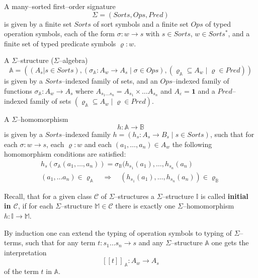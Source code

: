 \documentclass[landscape, autoslides, light]{mmiss}
\newcommand{\ekl}{[\![}
\newcommand{\ekr}{]\!]}
\begin{document}
\begin{Package}[Label={FSDPT}, Title={Formal Specification of Data and Process Types}, ShortTitle={FSDPT}, Authors={Horst Reichel}, Date={February 2003}, LevelOfDetail=Lecture, Language=en-GB]
\begin{Section}[Title={Initial Algebras as Data Types}, Label={section3}]
\begin{Section}[Title={Existence of initial models}, Label={section3_1}]
\begin{Paragraph}[Label=Paragraph24]
\pause

\small
\begin{Definition}[Title = {Many--sorted first--order signature}, Label = {signature}]
 A many--sorted first--order signature $$\Sigma =
(Sorts, Ops, Pred)$$ is given by a finite set $Sorts$ of sort
symbols and a finite set $Ops$ of typed operation symbols, each of
the form $\sigma : w \to s$ with $s \in Sorts$, $w \in Sorts^*$,
and a finite set of typed predicate symbols $\varrho : w$.

A $\Sigma$--structure ($\Sigma$--algebra) $$\mathbb{A} = ((A_s | s
\in Sorts), (\sigma_{\mathbb A} : A_w \to A_s \; | \; \sigma \in
Ops), (\varrho_{\mathbb A} \subseteq A_w \; | \;\varrho \in Pred
))$$ is given by a $Sorts$--indexed family of sets, and an
$Ops$--indexed family of functions $\sigma_{\mathbb A} : A_w \to
A_s $ where $A_{s_1\ldots s_n} = A_{s_1} \times \ldots A_{s_n}$
and $A_{\varepsilon} = \mathbf{1}$ and a $Pred$--indexed family of
sets $(\varrho_{\mathbb A} \subseteq A_w \; | \; \varrho \in
Pred)$.

A $\Sigma$--homomorphism $$h : \mathbb{A} \to \mathbb{B}$$ is
given by a $Sorts$--indexed family $h = (h_s : A_s \to B_s\; | \;
s \in Sorts)$, such that for each $\sigma : w \to s$, each
$\varrho : w$ and each $(a_1, \ldots , a_n) \in A_w$ the following
homomorphism conditions are satisfied: $$\begin{array}{ll}
 h_s(\sigma_{\mathbb A}(a_1, \ldots ,a_n)) = \sigma_{\mathbb
 B}(h_{s_1}(a_1), \ldots , h_{s_n}(a_n) \\
 (a_1, \ldots a_n) \in \varrho_{\mathbb A} \quad \Rightarrow \quad
 (h_{s_1}(a_1), \ldots , h_{s_n}(a_n)) \in \varrho_{\mathbb B}
 \end{array}$$ \end{Definition}



\end{Paragraph}
\begin{Paragraph}[Label=Paragraph25]
 \small
 Recall, that for a given class $\mathcal{C}$ of
 $\Sigma$--structures a $\Sigma$--structure $\mathbb{I}$ is called
 \textbf{initial in $\mathcal{C}$}, if for each $\Sigma$--structure
 $\mathbb{M} \in \mathcal{C}$ there is exactly one
 $\Sigma$--homomorphism $h : \mathbb{I} \to \mathbb{M}$.


 By induction one can extend the typing of operation symbols to
typing of $\Sigma$--terms, such that for any term $t : s_1 \ldots
s_n \to s$ and any $\Sigma$--structure $\mathbb A$ one gets the
interpretation $$\ekl t \ekr_{\:{\mathbb A}} : A_w \to A_s$$ of
the term $t$ in $\mathbb A$.


\end{Paragraph}
\end{Section}
\end{Section}
\end{Package}
\end{document}
